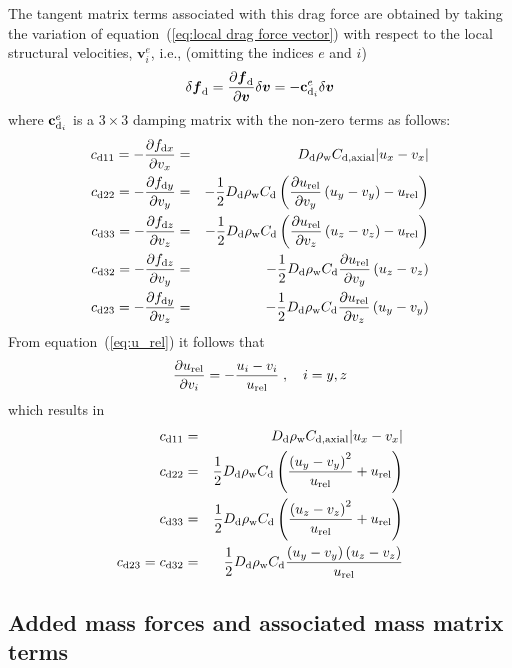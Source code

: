 The tangent matrix terms associated with this drag force are obtained by taking
the variation of equation~(\ref{eq:local drag force vector}) with respect to the
local structural velocities, $\bm{v}_i^e$, i.e.,
(omitting the indices $e$ and $i$)
%
\begin{equation}
\delta\mbox{\boldmath $f$}_{\rm d} =
\frac{\partial\mbox{\boldmath $f$}_{\rm d}}{\partial\mbox{\boldmath $v$}} \delta\mbox{\boldmath $v$} =
-{\bf c}_{{\rm d}_i}^e \delta\mbox{\boldmath $v$}
\end{equation}
%
where ${\bf c}_{{\rm d}_i}^e$ is a $3\times3$ damping matrix with the non-zero
terms as follows:
%
\begin{eqnarray}
c_{{\rm d}11} = -\frac{\partial f_{{\rm d}x}}{\partial v_x} &=&
\Dd\rhow \Cda |u_x - v_x| \\
%
c_{{\rm d}22} = -\frac{\partial f_{{\rm d}y}}{\partial v_y} &=&
-\frac{1}{2}\Dd\rhow \Cd \left(
\frac{\partial u_{\rm rel}}{\partial v_y}\left(u_y-v_y\right) - u_{\rm rel}
\right) \\
%
c_{{\rm d}33} = -\frac{\partial f_{{\rm d}z}}{\partial v_z} &=&
-\frac{1}{2}\Dd\rhow \Cd \left(
\frac{\partial u_{\rm rel}}{\partial v_z}\left(u_z-v_z\right) - u_{\rm rel}
\right) \\
%
c_{{\rm d}32} = -\frac{\partial f_{{\rm d}z}}{\partial v_y} &=&
-\frac{1}{2}\Dd\rhow \Cd
\frac{\partial u_{\rm rel}}{\partial v_y}\left(u_z-v_z\right) \\
%
c_{{\rm d}23} = -\frac{\partial f_{{\rm d}y}}{\partial v_z} &=&
-\frac{1}{2}\Dd\rhow \Cd
\frac{\partial u_{\rm rel}}{\partial v_z}\left(u_y-v_y\right)
\end{eqnarray}
%
From equation~(\ref{eq:u_rel}) it follows that
%
\begin{equation}
\frac{\partial u_{\rm rel}}{\partial v_i} = -\frac{u_i-v_i}{u_{\rm rel}}
\;,\quad i=y,z
\end{equation}
%
which results in
%
\begin{eqnarray}
c_{{\rm d}11} &=& \Dd\rhow\Cda |u_x - v_x| \\
%
c_{{\rm d}22} &=& \frac{1}{2}\Dd\rhow\Cd \left(
\frac{\left(u_y-v_y\right)^2}{u_{\rm rel}} + u_{\rm rel}
\right) \\
%
c_{{\rm d}33} &=& \frac{1}{2}\Dd\rhow\Cd \left(
\frac{\left(u_z-v_z\right)^2}{u_{\rm rel}} + u_{\rm rel}
\right) \\
%
c_{{\rm d}23} = c_{{\rm d}32} &=& \frac{1}{2}\Dd\rhow\Cd
\frac{\left(u_y-v_y\right)\left(u_z-v_z\right)}{u_{\rm rel}}
\end{eqnarray}

\subsection{Added mass forces and associated mass matrix terms}

